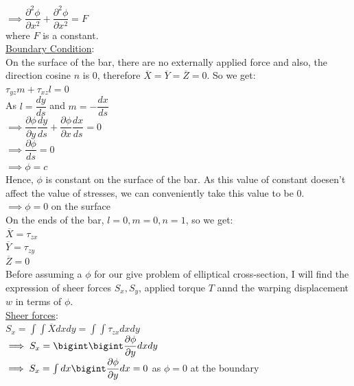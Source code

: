 \documentclass{article}
\begin{document}
\noindent $\implies \dfrac{\partial^2 \phi}{\partial x^2}+\dfrac{\partial^2 \phi}{\partial x^2}= F$ \\

where $F$ is a constant. \\

\noindent \underline{Boundary Condition}: \\

\noindent On the surface of the bar, there are no externally applied force and also, the direction cosine $n$ is 0, therefore $\overline{X}=\overline{Y}=\overline{Z}=0$. So we get: \\

\noindent $\tau_{yz}m+\tau_{xz}l=0$\\
As $l=\dfrac{dy}{ds}$ and $m=-\dfrac{dx}{ds}$ \\
$\implies \dfrac{\partial \phi}{\partial y}\dfrac{dy}{ds}+ \dfrac{\partial \phi}{\partial x}\dfrac{dx}{ds}  =0$\\
$\implies \dfrac{\partial \phi}{ds}= 0$\\
$\implies \phi=c$ \\

\noindent Hence, $\phi$ is constant on the surface of the bar. As this value of constant doesen't affect the value of stresses, we can conveniently take this value to be 0. \\

\noindent $\implies \phi=0$ on the surface\\

\noindent On the ends of the bar, $l=0, m=0, n=1$, so we get: \\
$\overline{X}=\tau_{zx}$\\ 
$\overline{Y}=\tau_{zy}$\\ 
$\overline{Z}=0$\\ 

\noindent Before assuming a $\phi$ for our give problem of elliptical cross-section, I will find the expression of sheer forces $S_x, S_y$, applied torque $T$ annd the warping displacement $w$ in terms of $\phi$. \\

\noindent \underline{Sheer forces}:\\

\noindent $S_x= \int \int \overline{X}dxdy= \int\int\tau_{zx}dxdy$\\
$\implies S_x= \bigint\bigint \dfrac{\partial\phi}{\partial y}dxdy$\\
$\implies S_x=\int dx\bigint\dfrac{\partial\phi}{\partial y}dx=0$ as $\phi=0$ at the boundary\\
\end{document}
